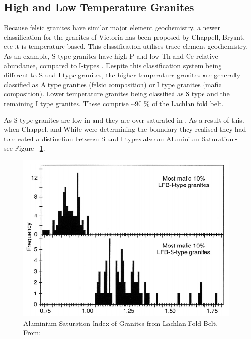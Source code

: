 \documentclass[a4paper]{article}
\begin{document}
\subsection{High and Low Temperature Granites}
Because felsic granites have similar major element geochemistry, a newer classification for the granites of Victoria has been proposed by Chappell, Bryant, etc it is temperature based. This classification utilises trace element geochemistry. As an example, S-type granites have high P and low Th and Ce relative abundance, compared to I-types \cite{chappell1998high}. Despite this classification system being different to S and I type granites, the higher temperature granites are generally classified as A type granites (felsic composition) or I type granites (mafic composition). Lower temperature granites being classified as S type and the remaining I type granites. These comprise \textasciitilde 90 \% of the Lachlan fold belt. \cite{chappell2001two}

As S-type granites are low in  and  they are over saturated in . As a result of this, when Chappell and White were determining the boundary they realised they had to created a distinction between S and I types also on Aluminium Saturation - see Figure  ~\ref{fig:AluminiumSaturationIndex}.

\begin{figure}[H]
\centering
\includegraphics[width=1\textwidth]{Aluminium_Saturation_Index.jpg}
\caption{\label{fig:AluminiumSaturationIndex}Aluminium Saturation Index of Granites from Lachlan Fold Belt. From: \cite{chappell1998high}}
\end{figure}
\end{document}
